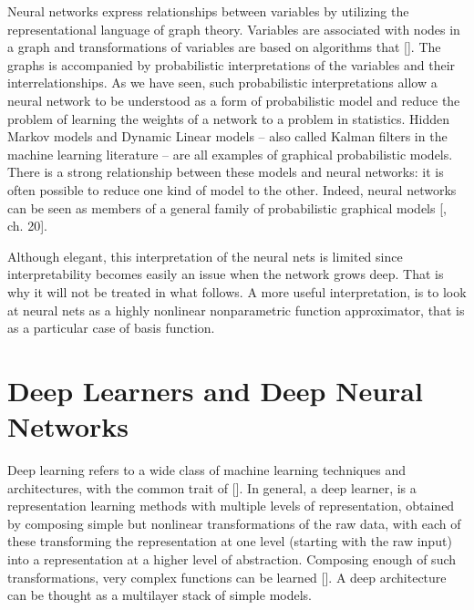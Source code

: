 Neural networks express relationships between variables by utilizing the representational language of graph theory. Variables are associated with nodes in a graph and transformations of variables are based on algorithms that  [\cite{Jordan1996}]. The graphs is accompanied by probabilistic interpretations of the variables and their interrelationships. As we have seen, such probabilistic interpretations allow a neural network to be understood as a form of probabilistic model and reduce the problem of learning the weights of a network to a problem in statistics. Hidden Markov models and Dynamic Linear models -- also called Kalman filters in the machine learning literature -- are all examples of graphical probabilistic models. There is a strong relationship between these models and neural networks: it is often possible to reduce one kind of model to the other. Indeed, neural networks can be seen as members of a general family of probabilistic graphical models [\cite{Goodfellow-et-al-2016}, ch. 20].

Although elegant, this interpretation of the neural nets is limited since interpretability becomes easily an issue when the network grows deep. That is why it will not be treated in what follows. A more useful interpretation, is to look at neural nets as a highly nonlinear nonparametric function approximator, that is as a particular case of basis function.


\section{Deep Learners and Deep Neural Networks}
Deep learning refers to a wide class of machine learning techniques and architectures, with the common trait of  [\cite{DengYu2014}]. In general, a deep learner, is a representation learning methods with multiple levels of representation, obtained by composing simple but nonlinear transformations of the raw data, with each of these transforming the representation at one level (starting with the raw input) into a representation at a higher level of abstraction. Composing enough of such transformations, very complex functions can be learned [\cite{LeCun2015}]. A deep architecture can be thought as a multilayer stack of simple models.

